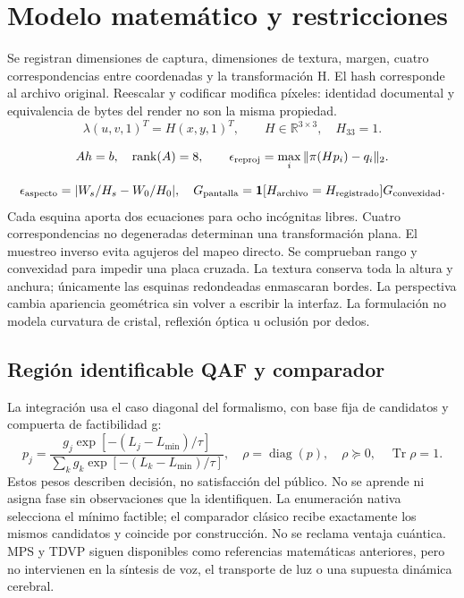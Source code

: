 \documentclass[10pt,a4paper]{article}
\begin{document}
\section{Modelo matemático y restricciones}
Se registran dimensiones de captura, dimensiones de textura, margen, cuatro correspondencias entre coordenadas y la transformación H. El hash corresponde al archivo original. Reescalar y codificar modifica píxeles: identidad documental y equivalencia de bytes del render no son la misma propiedad.
\begin{equation}\lambda(u,v,1)^T=H(x,y,1)^T,\qquad H\in\mathbb R^{3\times3},\quad H_{33}=1.\end{equation}

\begin{equation}Ah=b,\quad\operatorname{rank}(A)=8,\qquad\epsilon_{\rm reproj}=\max_i\|\pi(Hp_i)-q_i\|_2.\end{equation}

\begin{equation}\epsilon_{\rm aspecto}=|W_s/H_s-W_0/H_0|,\quad G_{\rm pantalla}=\mathbf1[H_{\rm archivo}=H_{\rm registrado}]G_{\rm convexidad}.\end{equation}
Cada esquina aporta dos ecuaciones para ocho incógnitas libres. Cuatro correspondencias no degeneradas determinan una transformación plana. El muestreo inverso evita agujeros del mapeo directo. Se comprueban rango y convexidad para impedir una placa cruzada. La textura conserva toda la altura y anchura; únicamente las esquinas redondeadas enmascaran bordes. La perspectiva cambia apariencia geométrica sin volver a escribir la interfaz. La formulación no modela curvatura de cristal, reflexión óptica u oclusión por dedos.
\subsection{Región identificable QAF y comparador}
La integración usa el caso diagonal del formalismo, con base fija de candidatos y compuerta de factibilidad g:
\begin{equation}
p_j=\frac{g_j\exp[-(L_j-L_{\min})/\tau]}{\sum_k g_k\exp[-(L_k-L_{\min})/\tau]},\quad\rho=\operatorname{diag}(p),\quad\rho\succeq0,\quad\operatorname{Tr}\rho=1.
\end{equation}
Estos pesos describen decisión, no satisfacción del público. No se aprende ni asigna fase sin observaciones que la identifiquen. La enumeración nativa selecciona el mínimo factible; el comparador clásico recibe exactamente los mismos candidatos y coincide por construcción. No se reclama ventaja cuántica. MPS y TDVP siguen disponibles como referencias matemáticas anteriores, pero no intervienen en la síntesis de voz, el transporte de luz o una supuesta dinámica cerebral.
\end{document}
